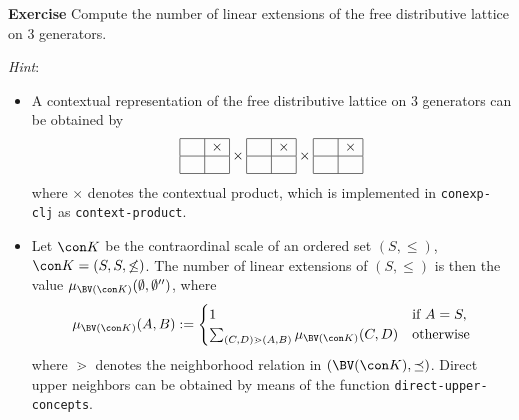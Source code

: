 \documentclass{article}
\newcommand{\cclj}{\texttt{conexp-clj}\xspace}
\newcounter{exercise}
\newenvironment{exercise}{\bigskip\stepcounter{exercise}\noindent\begingroup\textbf{Exercise
    \theexercise}\hspace*{.3cm}}{\endgroup}
\newcommand{\hint}{\medskip\noindent\emph{Hint}: }
\begin{document}
\begin{exercise}
  Compute the number of linear extensions of the free distributive lattice on 3
  generators.

  \hint
  \begin{itemize}
  \item A contextual representation of the free distributive lattice on 3 generators can
    be obtained by
    \begin{equation*}
      \def\context{
        \begin{array}{|c|c|}
          \hline
          \phantom{\times} & \times \\\hline
          ~ & ~\\
          \hline
        \end{array}
      }
      \context\times\context\times\context
    \end{equation*}
    where $\times$ denotes the contextual product, which is implemented in \cclj as
    \texttt{context-product}.
  \item Let $\con K$ be the contraordinal scale of an ordered set $(S, \le)$, \ie $\con K
    = (S, S, {\not\le})$.  The number of linear extensions of $(S, \le)$ is then the value
    $\mu_{\BV(\con K)}(\emptyset, \emptyset'')$, where
    \begin{equation*}
      \mu_{\BV(\con K)}(A, B) :=
      \begin{cases}
        1 & \text{if } A = S,\\
        \sum_{(C,D) \gtrdot (A, B)} \mu_{\BV(\con K)}(C,D) & \text{otherwise}
      \end{cases}
    \end{equation*}
    where $\gtrdot$ denotes the neighborhood relation in $(\BV(\con K), \preceq)$.  Direct
    upper neighbors can be obtained by means of the function
    \texttt{direct-upper-concepts}.
  \end{itemize}
\end{exercise}

\printbibliography
\end{document}
